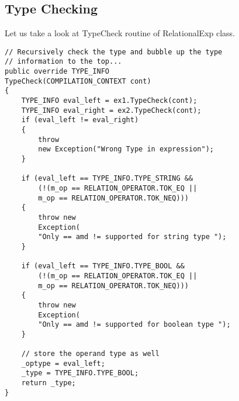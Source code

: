 \subsection{Type Checking}
Let us take a look at TypeCheck routine of RelationalExp class.
\lstset{style=csharp}
\begin{lstlisting}
// Recursively check the type and bubble up the type
// information to the top...
public override TYPE_INFO 
TypeCheck(COMPILATION_CONTEXT cont)
{
	TYPE_INFO eval_left = ex1.TypeCheck(cont);
	TYPE_INFO eval_right = ex2.TypeCheck(cont);
	if (eval_left != eval_right)
	{
		throw 
		new Exception("Wrong Type in expression");
	}
	
	if (eval_left == TYPE_INFO.TYPE_STRING &&
		(!(m_op == RELATION_OPERATOR.TOK_EQ ||
		m_op == RELATION_OPERATOR.TOK_NEQ)))
	{
		throw new 
		Exception(
		"Only == amd != supported for string type ");
	}

	if (eval_left == TYPE_INFO.TYPE_BOOL &&
		(!(m_op == RELATION_OPERATOR.TOK_EQ ||
		m_op == RELATION_OPERATOR.TOK_NEQ)))
	{
		throw new 
		Exception(
		"Only == amd != supported for boolean type ");
	}
 
	// store the operand type as well
	_optype = eval_left;
	_type = TYPE_INFO.TYPE_BOOL;
	return _type;
}
\end{lstlisting}
